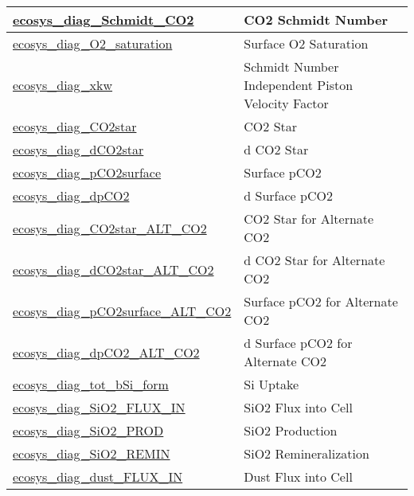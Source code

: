 {\begin{center}
\begin{longtable}{| p{2.0in} | p{4.0in} |}
    \hline
    \hyperref[subsec:var_sec_forcing_ecosys_diag_Schmidt_CO2]{ecosys\_diag\_Schmidt\_CO2} & CO2 Schmidt Number \\
    \hline
    \hyperref[subsec:var_sec_forcing_ecosys_diag_O2_saturation]{ecosys\_diag\_O2\_saturation} & Surface O2 Saturation \\
    \hline
    \hyperref[subsec:var_sec_forcing_ecosys_diag_xkw]{ecosys\_diag\_xkw} & Schmidt Number Independent Piston Velocity Factor \\
    \hline
    \hyperref[subsec:var_sec_forcing_ecosys_diag_CO2star]{ecosys\_diag\_CO2star} & CO2 Star \\
    \hline
    \hyperref[subsec:var_sec_forcing_ecosys_diag_dCO2star]{ecosys\_diag\_dCO2star} & d CO2 Star \\
    \hline
    \hyperref[subsec:var_sec_forcing_ecosys_diag_pCO2surface]{ecosys\_diag\_pCO2surface} & Surface pCO2 \\
    \hline
    \hyperref[subsec:var_sec_forcing_ecosys_diag_dpCO2]{ecosys\_diag\_dpCO2} & d Surface pCO2 \\
    \hline
    \hyperref[subsec:var_sec_forcing_ecosys_diag_CO2star_ALT_CO2]{ecosys\_diag\_CO2star\_ALT\_\-CO2} & CO2 Star for Alternate CO2 \\
    \hline
    \hyperref[subsec:var_sec_forcing_ecosys_diag_dCO2star_ALT_CO2]{ecosys\_diag\_dCO2star\_ALT\_\-CO2} & d CO2 Star for Alternate CO2 \\
    \hline
    \hyperref[subsec:var_sec_forcing_ecosys_diag_pCO2surface_ALT_CO2]{ecosys\_diag\_pCO2surface\_\-ALT\_CO2} & Surface pCO2 for Alternate CO2 \\
    \hline
    \hyperref[subsec:var_sec_forcing_ecosys_diag_dpCO2_ALT_CO2]{ecosys\_diag\_dpCO2\_ALT\_CO2} & d Surface pCO2 for Alternate CO2 \\
    \hline
    \hyperref[subsec:var_sec_forcing_ecosys_diag_tot_bSi_form]{ecosys\_diag\_tot\_bSi\_form} & Si Uptake \\
    \hline
    \hyperref[subsec:var_sec_forcing_ecosys_diag_SiO2_FLUX_IN]{ecosys\_diag\_SiO2\_FLUX\_IN} & SiO2 Flux into Cell \\
    \hline
    \hyperref[subsec:var_sec_forcing_ecosys_diag_SiO2_PROD]{ecosys\_diag\_SiO2\_PROD} & SiO2 Production \\
    \hline
    \hyperref[subsec:var_sec_forcing_ecosys_diag_SiO2_REMIN]{ecosys\_diag\_SiO2\_REMIN} & SiO2 Remineralization \\
    \hline
    \hyperref[subsec:var_sec_forcing_ecosys_diag_dust_FLUX_IN]{ecosys\_diag\_dust\_FLUX\_IN} & Dust Flux into Cell \\

\end{longtable}
\end{center}}
